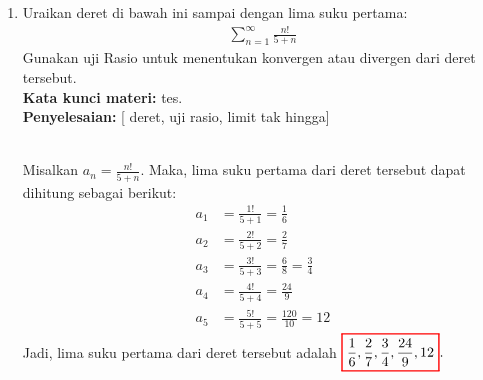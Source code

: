\documentclass[10pt,openany,a4paper]{article}
\theoremstyle{definition}
\theoremstyle{definition}
\theoremstyle{plain}
\newenvironment{jawab}[2][tes]{
\textbf{Kata kunci materi:} #1.\\
\textbf{Penyelesaian:} #2
}{}
\newenvironment{jawaban}[2][tes]{
\colorlet{oldcolor}{.}
        \color{red}
        \setlength{\fboxrule}{1pt}\boxed{\color{oldcolor}#2}\color{oldcolor}.
}{}
\begin{document}
\begin{enumerate}
        \item[5.]  Uraikan deret di bawah ini sampai dengan lima suku pertama:
        \begin{align*}
            \sum_{n=1}^{\infty}\frac{n!}{5+n}
        \end{align*}
        Gunakan uji Rasio untuk menentukan konvergen atau divergen dari deret tersebut.\\
        \begin{jawab}
            [deret, uji rasio, limit tak hingga]{\\
                Misalkan $a_n = \frac{n!}{5+n}$. Maka, lima suku pertama dari deret tersebut dapat dihitung sebagai berikut:
                \allowdisplaybreaks
                \begin{align*}
                    a_1 &= \frac{1!}{5+1} = \frac{1}{6} \\
                    a_2 &= \frac{2!}{5+2} = \frac{2}{7} \\
                    a_3 &= \frac{3!}{5+3} = \frac{6}{8} = \frac{3}{4} \\
                    a_4 &= \frac{4!}{5+4} = \frac{24}{9} \\
                    a_5 &= \frac{5!}{5+5} = \frac{120}{10} = 12
                \end{align*}
                Jadi, lima suku pertama dari deret tersebut adalah $
                \begin{jawaban}
                    {\frac{1}{6}, \frac{2}{7}, \frac{3}{4}, \frac{24}{9}, 12}
                \end{jawaban}$

}
\end{jawab}
\end{enumerate}
\end{document}
